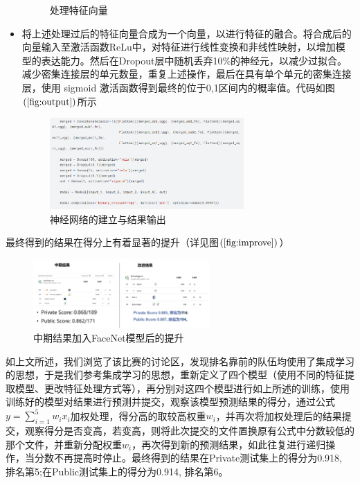 \documentclass[UTF8]{ctexart}
\begin{document}
\begin{itemize}
\begin{figure}[!ht]
    \caption{处理特征向量}
    \label{fig:feature}
  \end{figure}
  \item 将上述处理过后的特征向量合成为一个向量，以进行特征的融合。将合成后的向量输入至激活函数ReLu中，对特征进行线性变换和非线性映射，以增加模型的表达能力。然后在Dropout层中随机丢弃10\%的神经元，以减少过拟合。减少密集连接层的单元数量，重复上述操作，最后在具有单个单元的密集连接层，使用 sigmoid 激活函数得到最终的位于0,1区间内的概率值。代码如图$\left(\ref{fig:output}\right)$所示
  \begin{figure}[!ht]
    \centering
    \includegraphics[width=0.7\textwidth]{output.png}
    \caption{神经网络的建立与结果输出}
    \label{fig:output}
  \end{figure}
\end{itemize}

最终得到的结果在得分上有着显著的提升（详见图$\left(\ref{fig:improve}\right)$）
\begin{figure}[!ht]
  \centering
  \includegraphics[width=0.6\textwidth]{improve.png}
  \caption{中期结果加入FaceNet模型后的提升}
  \label{fig:improve}
\end{figure}

如上文所述，我们浏览了该比赛的讨论区，发现排名靠前的队伍均使用了集成学习的思想，于是我们参考集成学习的思想，重新定义了四个模型（使用不同的特征提取模型、更改特征处理方式等），再分别对这四个模型进行如上所述的训练，使用训练好的模型对结果进行预测并提交，观察该模型预测结果的得分，通过公式$y=\sum_{i = 1}^{5} w_ix_i $加权处理，得分高的取较高权重$w_i$，并再次将加权处理后的结果提交，观察得分是否变高，若变高，则将此次提交的文件置换原有公式中分数较低的那个文件，并重新分配权重$w_i$，再次得到新的预测结果，如此往复进行递归操作，当分数不再提高时停止。最终得到的结果在Private测试集上的得分为0.918, 排名第5;在Public测试集上的得分为0.914, 排名第6。
\end{document}
